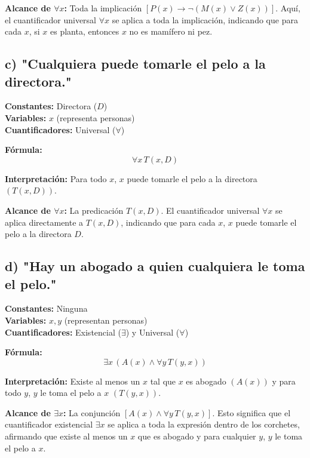 \documentclass[11pt,letterpaper]{article}
\begin{document}
\textbf{Alcance de \( \forall x \):}
Toda la implicación \( [P(x) \to \neg (M(x) \lor Z(x))] \). Aquí, el cuantificador universal \( \forall x \) se aplica a toda la implicación, indicando que para cada \( x \), si \( x \) es planta, entonces \( x \) no es mamífero ni pez.

\subsection*{c) "Cualquiera puede tomarle el pelo a la directora."}

\textbf{Constantes:} Directora (\( D \)) \\
\textbf{Variables:} \( x \) (representa personas) \\
\textbf{Cuantificadores:} Universal (\( \forall \))

\textbf{Fórmula:}
\[
\forall x \, T(x, D)
\]

\textbf{Interpretación:} Para todo \( x \), \( x \) puede tomarle el pelo a la directora \( (T(x, D)) \).

\textbf{ Alcance de \( \forall x \):}
La predicación \( T(x, D) \). El cuantificador universal \( \forall x \) se aplica directamente a \( T(x, D) \), indicando que para cada \( x \), \( x \) puede tomarle el pelo a la directora \( D \).

\subsection*{d) "Hay un abogado a quien cualquiera le toma el pelo."}

\textbf{Constantes:} Ninguna \\
\textbf{Variables:} \( x, y \) (representan personas) \\
\textbf{Cuantificadores:} Existencial (\( \exists \)) y Universal (\( \forall \))

\textbf{Fórmula:}
\[
\exists x \, (A(x) \land \forall y \, T(y, x))
\]

\textbf{Interpretación:} Existe al menos un \( x \) tal que \( x \) es abogado \( (A(x)) \) y para todo \( y \), \( y \) le toma el pelo a \( x \) \( (T(y, x)) \).

\textbf{Alcance de \( \exists x \):}
La conjunción \( [A(x) \land \forall y \, T(y, x)] \). Esto significa que el cuantificador existencial \( \exists x \) se aplica a toda la expresión dentro de los corchetes, afirmando que existe al menos un \( x \) que es abogado y para cualquier \( y \), \( y \) le toma el pelo a \( x \).
\end{document}
